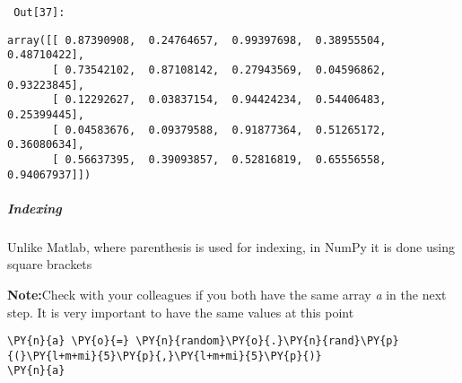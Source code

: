         {\par%
        \vspace{-1\smallerfontscale}%
        \noindent%
        \begin{minipage}{\cellleftmargin}%
    \hfill%
    {\smaller%
    \tt%
    \color{nbframe-out-prompt}%
    Out[37]:}%
    \hspace{\inputpadding}%
    \hspace{0em}%
    \hspace{3pt}%
    \end{minipage}%
        }%
    \begin{addmargin}[\cellleftmargin]{0em}%
    {\smaller%
    \vspace{-1\smallerfontscale}%
    
    
    
    \begin{verbatim}
array([[ 0.87390908,  0.24764657,  0.99397698,  0.38955504,  0.48710422],
       [ 0.73542102,  0.87108142,  0.27943569,  0.04596862,  0.93223845],
       [ 0.12292627,  0.03837154,  0.94424234,  0.54406483,  0.25399445],
       [ 0.04583676,  0.09379588,  0.91877364,  0.51265172,  0.36080634],
       [ 0.56637395,  0.39093857,  0.52816819,  0.65556558,  0.94067937]])
    \end{verbatim}

    
}%
    \end{addmargin}%

    \subparagraph{Indexing}


    Unlike Matlab, where parenthesis is used for indexing, in NumPy it is
done using square brackets

\textbf{Note:}Check with your colleagues if you both have the same array
\emph{a} in the next step. It is very important to have the same values
at this point


{\par%
\vspace{-1\baselineskip}%
}%
\begin{notebookcell}[46]%
\begin{addmargin}[\cellleftmargin]{0em}%
{\smaller%
\par%
%
\vspace{-1\smallerfontscale}%
\begin{Verbatim}[commandchars=\\\{\}]
\PY{n}{a} \PY{o}{=} \PY{n}{random}\PY{o}{.}\PY{n}{rand}\PY{p}{(}\PY{l+m+mi}{5}\PY{p}{,}\PY{l+m+mi}{5}\PY{p}{)}
\PY{n}{a}
\end{Verbatim}
%
\par%
\vspace{-1\smallerfontscale}}%
\end{addmargin}
\end{notebookcell}


